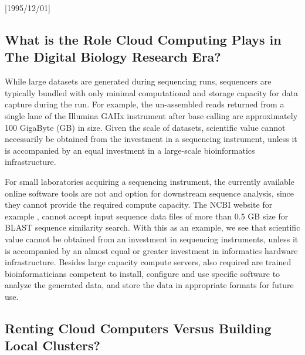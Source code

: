 \NeedsTeXFormat{LaTeX2e}[1995/12/01] \documentclass[10pt]{bmc_article}
\newenvironment{bmcformat}{\begin{raggedright}\baselineskip20pt\sloppy\setboolean{publ}{false}}{\end{raggedright}\baselineskip20pt\sloppy}
\begin{document}
\begin{bmcformat}
\subsection*{What is the Role Cloud Computing Plays in The Digital Biology Research Era?}

While large datasets are generated during sequencing runs, sequencers are typically bundled with only minimal
computational and storage capacity for data capture during the run.  For example, the un-assembled reads
returned from a single lane of the Illumina GAIIx instrument after base calling are approximately 100 GigaByte
(GB) in size. Given the scale of datasets, scientific value cannot necessarily be obtained from the investment
in a sequencing instrument, unless it is accompanied by an equal investment in a large-scale bioinformatics
infrastructure. \pb

For small laboratories acquiring a sequencing instrument, the currently available online software tools are
not and option for downstream sequence analysis, since they cannot provide the required compute capacity. The
NCBI website for example \cite{johnson2008ncbi}, cannot accept input sequence data files of more than 0.5 GB
size for BLAST sequence similarity search. With this as an example, we see that scientific value cannot be
obtained from an investment in sequencing instruments, unless it is accompanied by an almost equal or greater
investment in informatics hardware infrastructure. Besides large capacity compute servers, also required are
trained bioinformaticians competent to install, configure and use specific software to analyze the generated
data, and store the data in appropriate formats for future use.  \pb

\subsection*{Renting Cloud Computers Versus Building Local Clusters?}


\end{bmcformat}
\end{document}
